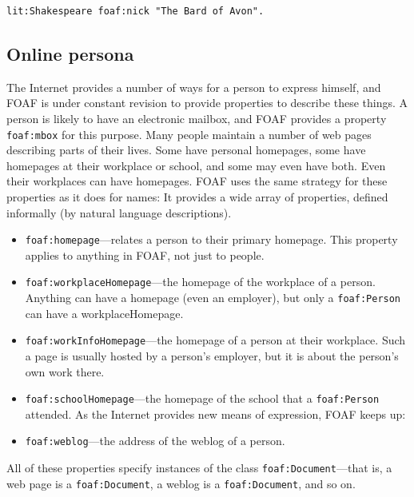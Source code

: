 \begin{lstlisting}
lit:Shakespeare foaf:nick "The Bard of Avon".
\end{lstlisting}

\subsection{Online persona}

The Internet provides a number of ways for a person to express himself,
and FOAF is under constant revision to provide properties to describe
these things. A person is likely to have an electronic mailbox, and FOAF
provides a property \texttt{foaf:mbox} for this purpose. Many people maintain a
number of web pages describing parts of their lives. Some have personal
homepages, some have homepages at their workplace or school, and some
may even have both. Even their workplaces can have homepages. FOAF uses
the same strategy for these properties as it does for names: It provides
a wide array of properties, defined informally (by natural language
descriptions).

\begin{itemize}
\item \texttt{foaf:homepage}---relates a person to their primary homepage. This
property applies to anything in
FOAF, not just to people.

\item \texttt{foaf:workplaceHomepage}---the homepage of the workplace of a person.
Anything can have a homepage (even an employer), but only a \texttt{foaf:Person}
can have a workplaceHomepage.

\item \texttt{foaf:workInfoHomepage}---the homepage of a person at their workplace.
Such a page is usually
hosted by a person's employer, but it is about the person's own work
there.

\item \texttt{foaf:schoolHomepage}---the homepage of the school that a \texttt{foaf:Person}
attended. As the Internet provides new means of expression, FOAF keeps
up:

\item \texttt{foaf:weblog}---the address of the weblog of a person.
\end{itemize}

All of these properties specify instances of the class
\texttt{foaf:Document}---that is, a web page is a \texttt{foaf:Document}, a weblog is a
\texttt{foaf:Document}, and so on.

